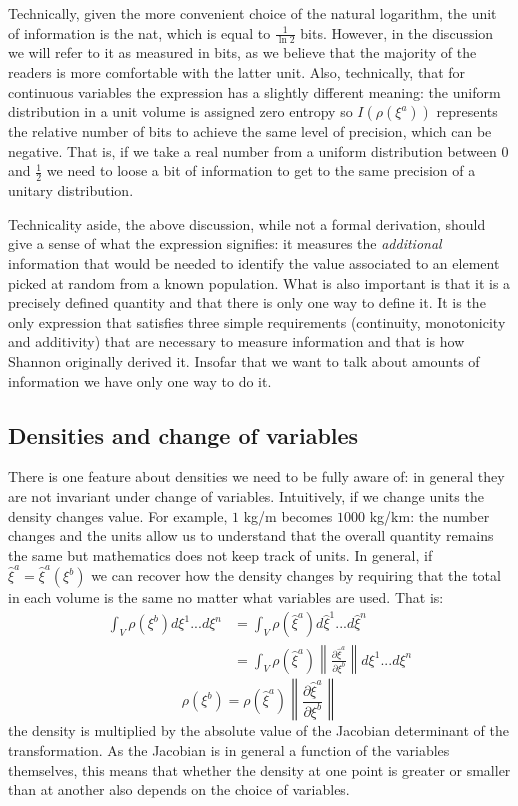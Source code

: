 \documentclass[11pt]{article}
\begin{document}
Technically, given the more convenient choice of the natural logarithm, the unit of information is the nat, which is equal to $\frac{1}{\ln 2}$ bits. However, in the discussion we will refer to it as measured in bits, as we believe that the majority of the readers is more comfortable with the latter unit. Also, technically, that for continuous variables the expression has a slightly different meaning: the uniform distribution in a unit volume is assigned zero entropy so $I(\rho(\xi^a))$ represents the relative number of bits to achieve the same level of precision, which can be negative. That is, if we take a real number from a uniform distribution between 0 and $\frac{1}{2}$ we need to loose a bit of information to get to the same precision of a unitary distribution.

Technicality aside, the above discussion, while not a formal derivation, should give a sense of what the expression signifies: it measures the \emph{additional} information that would be needed to identify the value associated to an element picked at random from a known population. What is also important is that it is a precisely defined quantity and that there is only one way to define it. It is the only expression that satisfies three simple requirements (continuity, monotonicity and additivity) that are necessary to measure information and that is how Shannon originally derived it. Insofar that we want to talk about amounts of information we have only one way to do it.

\subsection*{Densities and change of variables}

There is one feature about densities we need to be fully aware of: in general they are not invariant under change of variables. Intuitively, if we change units the density changes value. For example, $1$ kg/m becomes $1000$ kg/km: the number changes and the units allow us to understand that the overall quantity remains the same but mathematics does not keep track of units. In general, if $\hat{\xi}^a=\hat{\xi}^a(\xi^b)$ we can recover how the density changes by requiring that the total in each volume is the same no matter what variables are used. That is:
\begin{align*}
\int_V \rho(\xi^b) d\xi^1 ... d\xi^n &= \int_V \rho(\hat{\xi}^a) d\hat{\xi}^1 ... d\hat{\xi}^n \\
&=\int_V\rho(\hat{\xi}^a) \left\|\frac{\partial \hat{\xi}^a}{\partial \xi^b}\right\| d\xi^1 ... d\xi^n
\end{align*}
\begin{equation}\label{density_transformation}
\rho(\xi^b) = \rho(\hat{\xi}^a) \left\|\frac{\partial \hat{\xi}^a}{\partial \xi^b}\right\|
\end{equation}
the density is multiplied by the absolute value of the Jacobian determinant of the transformation. As the Jacobian is in general a function of the variables themselves, this means that whether the density at one point is greater or smaller than at another also depends on the choice of variables.
\end{document}

